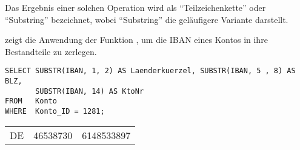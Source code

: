           \begin{merke}
            Das Ergebnis einer solchen Operation wird als \enquote{Teilzeichenkette} oder \enquote{Substring} bezeichnet, wobei \enquote{Substring} die geläufigere Variante darstellt.
          \end{merke}
           zeigt die Anwendung der Funktion , um die IBAN eines Kontos in ihre Bestandteile zu zerlegen.
          \begin{lstlisting}[language=oracle_sql,caption={Die Anwendung der Funktion \languageorasql{SUBSTR}},label=sql03_05]
SELECT SUBSTR(IBAN, 1, 2) AS Laenderkuerzel, SUBSTR(IBAN, 5 , 8) AS BLZ,
       SUBSTR(IBAN, 14) AS KtoNr
FROM   Konto
WHERE  Konto_ID = 1281;
          \end{lstlisting}
          \begin{center}
            \begin{small}
              \tablehead{}
              \begin{oraclesql}
                \begin{supertabular}{lrr}
                  DE & 46538730 & 6148533897 \\
                \end{supertabular}
              \end{oraclesql}
            \end{small}
          \end{center}
